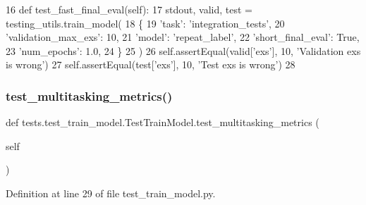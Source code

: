 \begin{DoxyCode}
16     \textcolor{keyword}{def }test\_fast\_final\_eval(self):
17         stdout, valid, test = testing\_utils.train\_model(
18             \{
19                 \textcolor{stringliteral}{'task'}: \textcolor{stringliteral}{'integration\_tests'},
20                 \textcolor{stringliteral}{'validation\_max\_exs'}: 10,
21                 \textcolor{stringliteral}{'model'}: \textcolor{stringliteral}{'repeat\_label'},
22                 \textcolor{stringliteral}{'short\_final\_eval'}: \textcolor{keyword}{True},
23                 \textcolor{stringliteral}{'num\_epochs'}: 1.0,
24             \}
25         )
26         self.assertEqual(valid[\textcolor{stringliteral}{'exs'}], 10, \textcolor{stringliteral}{'Validation exs is wrong'})
27         self.assertEqual(test[\textcolor{stringliteral}{'exs'}], 10, \textcolor{stringliteral}{'Test exs is wrong'})
28 
\end{DoxyCode}
\mbox{\label{classtests_1_1test__train__model_1_1TestTrainModel_a099516526ea34f8ad88bf921e94c01b9}} 
\subsubsection{\texorpdfstring{test\+\_\+multitasking\+\_\+metrics()}{test\_multitasking\_metrics()}}
{\footnotesize\ttfamily def tests.\+test\+\_\+train\+\_\+model.\+Test\+Train\+Model.\+test\+\_\+multitasking\+\_\+metrics (\begin{DoxyParamCaption}\item[{}]{self }\end{DoxyParamCaption})}



Definition at line 29 of file test\+\_\+train\+\_\+model.\+py.


